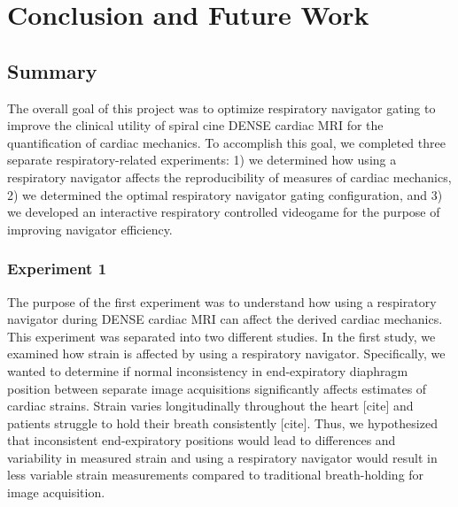 \chapter{Conclusion and Future Work}

\section{Summary}
	The overall goal of this project was to optimize respiratory navigator gating to improve the clinical utility of spiral cine DENSE cardiac MRI for the quantification of cardiac mechanics. To accomplish this goal, we completed three separate respiratory-related experiments: 1) we determined how using a respiratory navigator affects the reproducibility of measures of cardiac mechanics, 2) we determined the optimal respiratory navigator gating configuration, and 3) we developed an interactive respiratory controlled videogame for the purpose of improving navigator efficiency.
	
\subsection{Experiment 1}
	
	The purpose of the first experiment was to understand how using a respiratory navigator during DENSE cardiac MRI can affect the derived cardiac mechanics. This experiment was separated into two different studies. In the first study, we examined how strain is affected by using a respiratory navigator. Specifically, we wanted to determine if normal inconsistency in end-expiratory diaphragm position between separate image acquisitions significantly affects estimates of cardiac strains. Strain varies longitudinally throughout the heart [cite] and patients struggle to hold their breath consistently [cite]. Thus, we hypothesized that inconsistent end-expiratory positions would lead to differences and variability in measured strain and using a respiratory navigator would result in less variable strain measurements compared to traditional breath-holding for image acquisition. 
	
